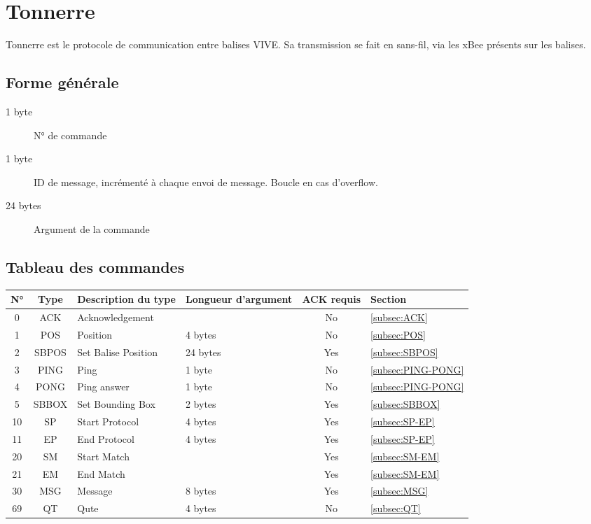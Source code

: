 ﻿\section{Tonnerre}

Tonnerre est le protocole de communication entre balises VIVE.
Sa transmission se fait en sans-fil, via les xBee présents sur les balises.

\subsection{Forme générale}

\begin{description}
	\item[1 byte] N° de commande
	\item[1 byte] ID de message, incrémenté à chaque envoi de message. Boucle en cas d'overflow.
	\item[24 bytes] Argument de la commande
\end{description}

\subsection{Tableau des commandes}

\begin{tabular}{|c|c|l|l|c|l|}

\hline
N° & Type  & Description du type & Longueur d'argument & ACK requis & Section \\
\hline
0  & ACK   & Acknowledgement     &          & No & \ref{subsec:ACK} \\
\hline
1  & POS   & Position            & 4 bytes  & No & \ref{subsec:POS} \\
2  & SBPOS & Set Balise Position & 24 bytes & Yes & \ref{subsec:SBPOS} \\
\hline
3  & PING  & Ping                & 1 byte   & No & \ref{subsec:PING-PONG} \\
4  & PONG  & Ping answer         & 1 byte   & No & \ref{subsec:PING-PONG} \\
\hline
5  & SBBOX & Set Bounding Box    & 2 bytes  & Yes & \ref{subsec:SBBOX} \\
\hline
10 & SP    & Start Protocol      & 4 bytes  & Yes & \ref{subsec:SP-EP} \\
11 & EP    & End Protocol        & 4 bytes  & Yes & \ref{subsec:SP-EP} \\
\hline
20 & SM    & Start Match         &          & Yes & \ref{subsec:SM-EM} \\
21 & EM    & End Match           &          & Yes & \ref{subsec:SM-EM} \\
\hline
30 & MSG   & Message             & 8 bytes  & Yes & \ref{subsec:MSG} \\
\hline
69 & QT    & Qute                & 4 bytes  & No & \ref{subsec:QT} \\
\hline

\end{tabular}

